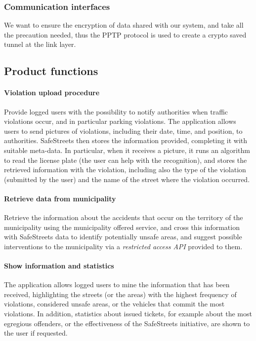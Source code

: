 \subsubsection{Communication interfaces}
	We want to ensure the encryption of data shared with our system, and take all the precaution needed, thus the PPTP protocol is used to create a crypto saved tunnel at the link layer.
\subsection{Product functions}
\paragraph{Violation upload procedure} 
Provide logged users with the possibility to notify authorities when traffic violations occur, and in particular parking violations. The application allows users to send pictures of violations, including their date, time, and position, to authorities. 
SafeStreets then stores the information provided, completing it with suitable meta-­data. In particular, when it receives a picture, it runs an algorithm to read the license plate (the user can help with the recognition), and stores the retrieved information with the violation, including also the type of the violation (submitted by the user) and the name of the street where the violation occurred.

\paragraph{Retrieve data from municipality}
Retrieve the information about the accidents that occur on the territory of the municipality using the municipality offered service, and cross this information with SafeStreets data to identify potentially unsafe areas, and suggest possible interventions to the municipality via a \emph{restricted access API} provided to them.

\paragraph{Show information and statistics}
The application allows logged users to mine the information that has been received, highlighting the streets (or the areas) with the highest frequency of violations, considered unsafe areas, or the vehicles that commit the most violations. In addition, statistics about issued tickets, for example about the most egregious offenders, or the effectiveness of the SafeStreets initiative, are shown to the user if requested. 

